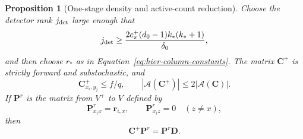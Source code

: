 \documentclass[11pt]{article}
\numberwithin{equation}{section}
\newtheorem{proposition}[theorem]{Proposition}
\theoremstyle{definition}
\theoremstyle{remark}
\begin{document}
\begin{proposition}[One-stage density and active-count reduction]
\label{prop:hier-copy-step}
Choose the detector rank ${j_{\rm det}}$ large enough that
\begin{equation}
 {j_{\rm det}}\geq\frac{2{c_\pi^+}({d}_0-1)k_*(k_*+1)}{\delta_0},
 \label{eq:hier-active-J}
\end{equation}
and then choose ${r}_*$ as in Equation~\eqref{eq:hier-column-constants}.
The matrix ${\mathbf{C}}^+$ is strictly forward and substochastic, and
\[
 {\mathbf{C}}^{+}_{x_i,y_j}\leq f/q,
 \qquad |\mathcal A({\mathbf{C}}^+)|\leq2|\mathcal A({\mathbf{C}})|.
\]
If ${\mathbf{P}}^r$ is the matrix from $V^+$ to $V$ defined by
\begin{equation}
 {\mathbf{P}}^{r}_{x_ix}={\mathbf{r}}_{i,x},\qquad
 {\mathbf{P}}^{r}_{x_iz}=0\quad(z\ne x),
 \label{eq:hier-projection}
\end{equation}
then
\begin{equation}
 {\mathbf{C}}^+{\mathbf{P}}^r={\mathbf{P}}^r{\mathbf{D}}.
 \label{eq:hier-one-step-intertwining}
\end{equation}
\end{proposition}
\end{document}

